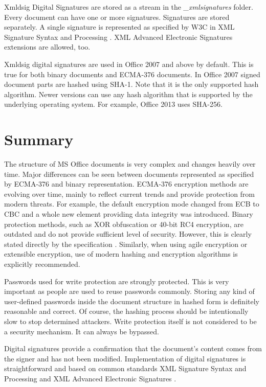 \documentclass[11pt,oneside]{fithesis2}
\begin{document}
Xmldsig Digital Signatures are stored as a stream in the \textit{\_xmlsignatures} folder. Every document can have one or more signatures. Signatures are stored separately. A single signature is represented as specified by W3C in XML Signature Syntax and Processing \cite{xmlsig}. XML Advanced Electronic Signatures \cite{xades} extensions are allowed, too.

Xmldsig digital signatures are used in Office 2007 and above by default. This is true for both binary documents and ECMA-376 documents. In Office 2007 signed document parts are hashed using SHA-1. Note that it is the only supported hash algorithm. Newer versions can use any hash algorithm that is supported by the underlying operating system. For example, Office 2013 uses SHA-256.

\section{Summary}

The structure of MS Office documents is very complex and changes heavily over time. Major differences can be seen between documents represented as specified by ECMA-376 and binary representation. ECMA-376 encryption methods are evolving over time, mainly to reflect current trends and provide protection from modern threats. For example, the default encryption mode changed from ECB to CBC and a whole new element providing data integrity was introduced. Binary protection methods, such as XOR obfuscation or 40-bit RC4 encryption, are outdated and do not provide sufficient level of security. However, this is clearly stated directly by the specification \cite[p. 93]{msoffcrypto}. Similarly, when using agile encryption or extensible encryption, use of modern hashing and encryption algorithms is explicitly recommended.

Passwords used for write protection are strongly protected. This is very important as people are used to reuse passwords commonly. Storing any kind of user-defined passwords inside the document structure in hashed form is definitely reasonable and correct. Of course, the hashing process should be intentionally slow to stop determined attackers. Write protection itself is not considered to be a security mechanism. It can always be bypassed. 

Digital signatures provide a confirmation that the document's content comes from the signer and has not been modified. Implementation of digital signatures is straightforward and based on common standards XML Signature Syntax and Processing \cite{xmlsig} and XML Advanced Electronic Signatures \cite{xades}. 
\end{document}
